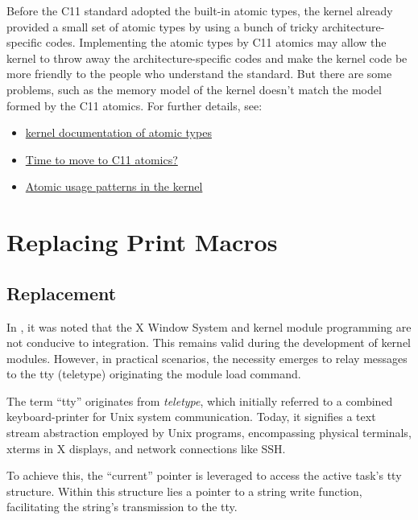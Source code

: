 \documentclass[10pt, oneside]{book}
\begin{document}

Before the C11 standard adopted the built-in atomic types, the kernel already provided a small set of atomic types by using a bunch of tricky architecture-specific codes.
Implementing the atomic types by C11 atomics may allow the kernel to throw away the architecture-specific codes and make the kernel code be more friendly to the people who understand the standard.
But there are some problems, such as the memory model of the kernel doesn't match the model formed by the C11 atomics.
For further details, see:
\begin{itemize}
  \item \href{https://www.kernel.org/doc/Documentation/atomic_t.txt}{kernel documentation of atomic types}
  \item \href{https://lwn.net/Articles/691128/}{Time to move to C11 atomics?}
  \item \href{https://lwn.net/Articles/698315/}{Atomic usage patterns in the kernel}
\end{itemize}

\section{Replacing Print Macros}
\label{sec:print_macros}
\subsection{Replacement}
In , it was noted that the X Window System and kernel module programming are not conducive to integration.
This remains valid during the development of kernel modules.
However, in practical scenarios, the necessity emerges to relay messages to the tty (teletype) originating the module load command.

The term ``tty'' originates from \emph{teletype}, which initially referred to a combined keyboard-printer for Unix system communication.
Today, it signifies a text stream abstraction employed by Unix programs, encompassing physical terminals,
xterms in X displays, and network connections like SSH.

To achieve this, the ``current'' pointer is leveraged to access the active task's tty structure.
Within this structure lies a pointer to a string write function, facilitating the string's transmission to the tty.

\end{document}
